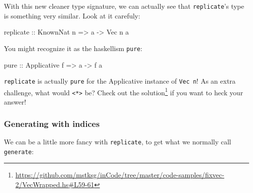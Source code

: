 \documentclass[]{article}
\newenvironment{Shaded}{}{}
\newcommand{\KeywordTok}[1]{\textcolor[rgb]{0.00,0.44,0.13}{\textbf{#1}}}
\newcommand{\DataTypeTok}[1]{\textcolor[rgb]{0.56,0.13,0.00}{#1}}
\newcommand{\CommentTok}[1]{\textcolor[rgb]{0.38,0.63,0.69}{\textit{#1}}}
\newcommand{\OtherTok}[1]{\textcolor[rgb]{0.00,0.44,0.13}{#1}}
\newcommand{\FunctionTok}[1]{\textcolor[rgb]{0.02,0.16,0.49}{#1}}
\newcommand{\NormalTok}[1]{#1}
\renewcommand{\href}[2]{#2\footnote{\url{#1}}}
\begin{document}
With this new cleaner type signature, we can actually see that
\texttt{replicate}'s type is something very similar. Look at it carefuly:

\begin{Shaded}
\begin{Highlighting}[]
\NormalTok{replicate}\OtherTok{ ::} \DataTypeTok{KnownNat}\NormalTok{ n }\OtherTok{=>}\NormalTok{ a }\OtherTok{->} \DataTypeTok{Vec}\NormalTok{ n a}
\end{Highlighting}
\end{Shaded}

You might recognize it as the haskellism \texttt{pure}:

\begin{Shaded}
\begin{Highlighting}[]
\NormalTok{pure}\OtherTok{ ::} \DataTypeTok{Applicative}\NormalTok{ f }\OtherTok{=>}\NormalTok{ a }\OtherTok{->}\NormalTok{ f a}
\end{Highlighting}
\end{Shaded}

\texttt{replicate} is actually \texttt{pure} for the Applicative instance of
\texttt{Vec\ n}! As an extra challenge, what would
\texttt{\textless{}*\textgreater{}} be? Check out
\href{https://github.com/mstksg/inCode/tree/master/code-samples/fixvec-2/VecWrapped.hs\#L59-61}{the
solution} if you want to heck your answer!

\subsubsection{Generating with indices}\label{generating-with-indices}

We can be a little more fancy with \texttt{replicate}, to get what we normally
call \texttt{generate}:

\begin{Shaded}
\end{Shaded}
\end{document}
